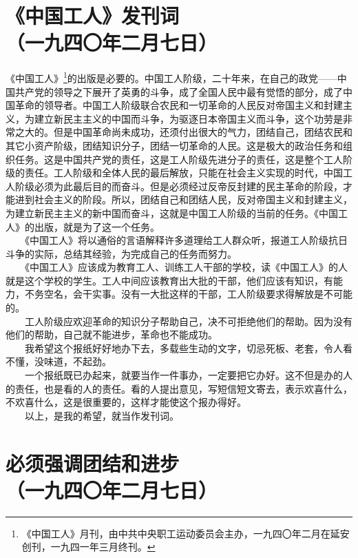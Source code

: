 \documentclass[cn,11pt,chinese]{elegantbook}
\def\myformat#1{\hfil\hfil #1}
\begin{document}
\section*{\myformat{《中国工人》发刊词}\\\myformat{（一九四〇年二月七日）}}
《中国工人》\footnote[1]{ 《中国工人》月刊，由中共中央职工运动委员会主办，一九四〇年二月在延安创刊，一九四一年三月终刊。}的出版是必要的。中国工人阶级，二十年来，在自己的政党——中国共产党的领导之下展开了英勇的斗争，成了全国人民中最有觉悟的部分，成了中国革命的领导者。中国工人阶级联合农民和一切革命的人民反对帝国主义和封建主义，为建立新民主主义的中国而斗争，为驱逐日本帝国主义而斗争，这个功劳是非常之大的。但是中国革命尚未成功，还须付出很大的气力，团结自己，团结农民和其它小资产阶级，团结知识分子，团结一切革命的人民。这是极大的政治任务和组织任务。这是中国共产党的责任，这是工人阶级先进分子的责任，这是整个工人阶级的责任。工人阶级和全体人民的最后解放，只能在社会主义实现的时代，中国工人阶级必须为此最后目的而奋斗。但是必须经过反帝反封建的民主革命的阶段，才能进到社会主义的阶段。所以，团结自己和团结人民，反对帝国主义和封建主义，为建立新民主主义的新中国而奋斗，这就是中国工人阶级的当前的任务。《中国工人》的出版，就是为了这一个任务。\\
　　《中国工人》将以通俗的言语解释许多道理给工人群众听，报道工人阶级抗日斗争的实际，总结其经验，为完成自己的任务而努力。\\
　　《中国工人》应该成为教育工人、训练工人干部的学校，读《中国工人》的人就是这个学校的学生。工人中间应该教育出大批的干部，他们应该有知识，有能力，不务空名，会干实事。没有一大批这样的干部，工人阶级要求得解放是不可能的。\\
　　工人阶级应欢迎革命的知识分子帮助自己，决不可拒绝他们的帮助。因为没有他们的帮助，自己就不能进步，革命也不能成功。\\
　　我希望这个报纸好好地办下去，多载些生动的文字，切忌死板、老套，令人看不懂，没味道，不起劲。\\
　　一个报纸既已办起来，就要当作一件事办，一定要把它办好。这不但是办的人的责任，也是看的人的责任。看的人提出意见，写短信短文寄去，表示欢喜什么，不欢喜什么，这是很重要的，这样才能使这个报办得好。\\
　　以上，是我的希望，就当作发刊词。\\
\newpage\section*{\myformat{必须强调团结和进步}\\\myformat{（一九四〇年二月七日）}}
\end{document}
